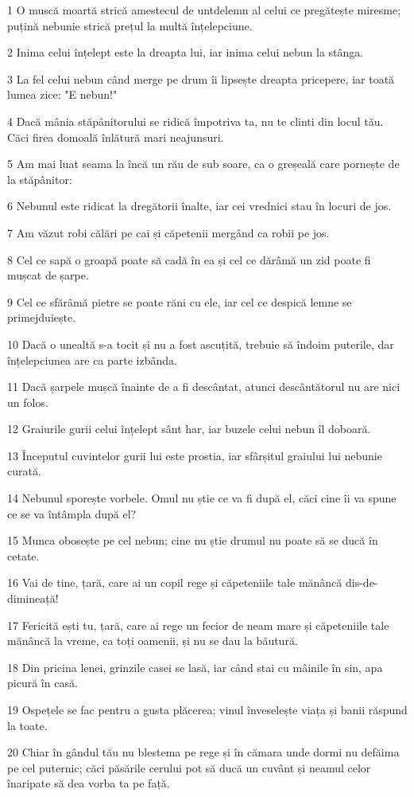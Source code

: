 \par 1 O muscă moartă strică amestecul de untdelemn al celui ce pregătește miresme; puțină nebunie strică prețul la multă înțelepciune.
\par 2 Inima celui înțelept este la dreapta lui, iar inima celui nebun la stânga.
\par 3 La fel celui nebun când merge pe drum îi lipsește dreapta pricepere, iar toată lumea zice: "E nebun!"
\par 4 Dacă mânia stăpânitorului se ridică împotriva ta, nu te clinti din locul tău. Căci firea domoală înlătură mari neajunsuri.
\par 5 Am mai luat seama la încă un rău de sub soare, ca o greșeală care pornește de la stăpânitor:
\par 6 Nebunul este ridicat la dregătorii înalte, iar cei vrednici stau în locuri de jos.
\par 7 Am văzut robi călări pe cai și căpetenii mergând ca robii pe jos.
\par 8 Cel ce sapă o groapă poate să cadă în ea și cel ce dărâmă un zid poate fi mușcat de șarpe.
\par 9 Cel ce sfărâmă pietre se poate răni cu ele, iar cel ce despică lemne se primejduiește.
\par 10 Dacă o unealtă s-a tocit și nu a fost ascuțită, trebuie să îndoim puterile, dar înțelepciunea are ca parte izbânda.
\par 11 Dacă șarpele mușcă înainte de a fi descântat, atunci descântătorul nu are nici un folos.
\par 12 Graiurile gurii celui înțelept sânt har, iar buzele celui nebun îl doboară.
\par 13 Începutul cuvintelor gurii lui este prostia, iar sfârșitul graiului lui nebunie curată.
\par 14 Nebunul sporește vorbele. Omul nu știe ce va fi după el, căci cine îi va spune ce se va întâmpla după el?
\par 15 Munca obosește pe cel nebun; cine nu știe drumul nu poate să se ducă în cetate.
\par 16 Vai de tine, țară, care ai un copil rege și căpeteniile tale mănâncă dis-de-dimineață!
\par 17 Fericită ești tu, țară, care ai rege un fecior de neam mare și căpeteniile tale mănâncă la vreme, ca toți oamenii, și nu se dau la băutură.
\par 18 Din pricina lenei, grinzile casei se lasă, iar când stai cu mâinile în sin, apa picură în casă.
\par 19 Ospețele se fac pentru a gusta plăcerea; vinul înveselește viața și banii răspund la toate.
\par 20 Chiar în gândul tău nu blestema pe rege și în cămara unde dormi nu defăima pe cel puternic; căci păsările cerului pot să ducă un cuvânt și neamul celor înaripate să dea vorba ta pe față.

